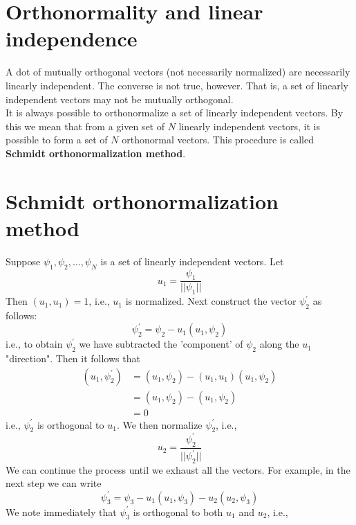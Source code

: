 \section{Orthonormality and linear independence}
A dot of mutually orthogonal vectors (not necessarily normalized) are necessarily linearly independent. The converse is not true, however. That is, a set of linearly independent vectors may not be mutually orthogonal.\\
It  is always possible to orthonormalize a set of linearly independent vectors. By this we mean that from a given set of $N$ linearly independent vectors, it is possible to form a set of $N$ orthonormal vectors. This procedure is called \textbf{Schmidt orthonormalization method}.

\section{Schmidt orthonormalization method}
\label{chapter2.schmidt-orthonormalization-method}
Suppose $\psi_1, \psi_2, \ldots, \psi_N$ is a set of linearly independent vectors. Let
\begin{equation}\label{eqn:2.72}
u_1 = \frac{\psi_1}{||\psi_1||}
\end{equation}
Then $(u_1, u_1) = 1$, i.e., $u_1$ is normalized. Next construct the vector $\psi_2^\prime$ as follows:
\begin{equation}\label{eqn:2.73}
\psi_2^\prime = \psi_2 - u_1(u_1, \psi_2)
\end{equation}
i.e., to obtain $\psi_2^\prime$ we have subtracted the 'component' of $\psi_2$ along the $u_1$ "direction". Then it follows that
\begin{eqnarray}\label{eqn:2.74-2.76}
	(u_1, \psi_2^\prime) &= (u_1, \psi_2) - (u_1, u_1)(u_1, \psi_2) \\
	&= (u_1, \psi_2) - (u_1, \psi_2) \\
	&= 0
\end{eqnarray}
i.e., $\psi_2^\prime$ is orthogonal to $u_1$. We then normalize $\psi_2^\prime$, i.e.,
\begin{equation}\label{eqn:2.77}
u_2 = \frac{\psi_2^\prime}{||\psi_2^\prime ||}
\end{equation}
We can continue the process until we exhaust all the vectors. For example, in the next step we can write
\begin{equation}\label{eqn:2.78}
\psi_3^\prime = \psi_3 - u_1 (u_1, \psi_3) - u_2 (u_2, \psi_3)
\end{equation}
We note immediately that $\psi_3^\prime$ is orthogonal to both $u_1$ and $u_2$, i.e.,
